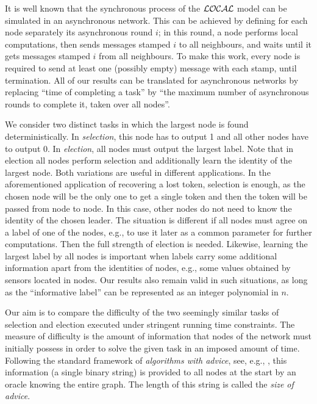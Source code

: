 \documentclass[11pt]{article}
\begin{document}
It is well known that the synchronous process of the $\cal{LOCAL}$  model can be simulated in an asynchronous network. This can be achieved 
by defining for each node separately its asynchronous round $i$;
in this round, a node performs local computations, then sends messages stamped $i$ to all neighbours, and  waits until it gets messages stamped $i$ from all neighbours.
To make this work, every node is required to send at least one (possibly empty) message with each stamp, until termination.
All of our results can be translated for asynchronous networks by replacing ``time of completing a task''  by ``the maximum number of asynchronous rounds  to complete it, taken over all nodes''.

We consider two distinct tasks in which the largest node is found deterministically.
In {\em selection}, this node has to output 1 and all other nodes have to output 0. In {\em election}, all nodes must output the largest label.
Note that in election all nodes perform selection and additionally learn the identity of the largest node.
Both variations are useful in different applications. In the aforementioned application of recovering a lost
token, selection is enough, as the chosen node will be the only one to get a single token and then the token will be passed from node to node. In this case,
other nodes do not need to know the identity of the chosen leader. The situation is different if all nodes must agree on a label of one of the nodes, e.g., to use it later
as a common parameter for further computations. Then the full strength of election is needed. Likewise, learning the largest label by all nodes is important when
labels carry some additional information apart from the identities of nodes, e.g., some values obtained by sensors located in nodes. Our results also remain valid
in such situations, as long as the  ``informative label'' can be represented as an integer polynomial in $n$.  

Our aim is to compare the difficulty of the two seemingly similar tasks of selection and election executed under stringent running time constraints. 
The measure of difficulty is the amount of information
 that nodes of the network must initially possess in order to solve the given task in an imposed amount of time. Following the standard framework of {\em algorithms
with advice}, see, e.g.,   \cite{DP,EFKR,FGIP,FKL,FP,IKP,SN}, this information (a single binary string) is provided to all nodes at the start by an oracle knowing the entire graph. The length of this string is called the {\em size of advice}. 
\end{document}
